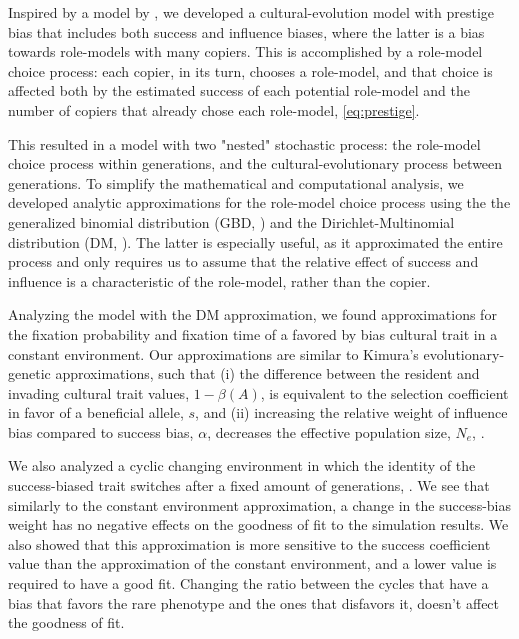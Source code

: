 \documentclass[12pt]{extarticle}
\begin{document}
Inspired by a model by \citet{evolutionBook}, we developed a cultural-evolution model with prestige bias that includes both success and influence biases, where the latter is a bias towards role-models with many copiers. This is accomplished by a role-model choice process: each copier, in its turn, chooses a role-model, and that choice is affected both by the estimated success of each potential role-model and the number of copiers that already chose each role-model, \cref{eq:prestige}. 

This resulted in a model with two "nested" stochastic process: the role-model choice process within generations, and the cultural-evolutionary process between generations. To simplify the mathematical and computational analysis, we developed analytic approximations for the role-model choice process using the the generalized binomial distribution (GBD, ) and the Dirichlet-Multinomial distribution (DM, ).
The latter is especially useful, as it approximated the entire process and only requires us to assume that the relative effect of success and influence is a characteristic of the role-model, rather than the copier.

Analyzing the model with the DM approximation, we found approximations for the fixation probability and fixation time of a favored by bias cultural trait in a constant environment.
Our approximations are similar to Kimura's evolutionary-genetic approximations, such that (i) the difference between the resident and invading cultural trait values, $1-\beta(A)$, is equivalent to the selection coefficient in favor of a beneficial allele, $s$, and (ii) increasing the relative weight of influence bias compared to success bias, $\alpha$, decreases the effective population size, $N_e$, .

We also analyzed a cyclic changing environment in which the identity of the success-biased trait switches after a fixed amount of generations, .
We see that similarly to the constant environment approximation, a change in the success-bias weight has no negative effects on the goodness of fit to the simulation results.
We also showed that this approximation is more sensitive to the success coefficient value than the approximation of the constant environment, and a lower value is required to have a good fit. Changing the ratio between the cycles that have a bias that favors the rare phenotype and the ones that disfavors it, doesn't affect the goodness of fit. 
\end{document}
